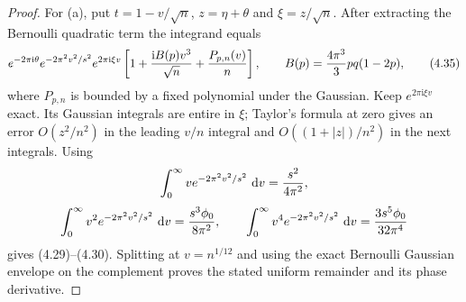 \documentclass[11pt,a4paper]{article}
\numberwithin{equation}{section}
\theoremstyle{definition}
\theoremstyle{remark}
\newcommand{\ii}{\mathrm i}
\newcommand{\dd}{\,\mathrm d}
\begin{document}
\begin{proof}
For (a), put $t=1-v/\sqrt n$, $z=\eta+\theta$ and
$\xi=z/\sqrt n$.  After extracting the Bernoulli quadratic term the
integrand equals
\[
 e^{-2\pi\ii\theta}e^{-2\pi^2v^2/s^2}e^{2\pi\ii\xi v}
 \left[1+{\ii B(p)v^3\over\sqrt n}+{P_{p,n}(v)\over n}\right],
 \qquad B(p)={4\pi^3\over3}pq(1-2p),                  \tag{4.35}
\]
where $P_{p,n}$ is bounded by a fixed polynomial under the Gaussian.
Keep $e^{2\pi\ii\xi v}$ exact.  Its Gaussian integrals are entire in
$\xi$; Taylor's formula at zero gives an error $O(z^2/n^2)$ in the
leading $v/n$ integral and $O((1+|z|)/n^2)$ in the next integrals.
Using
\[
 \int_0^\infty ve^{-2\pi^2v^2/s^2}\,\dd v={s^2\over4\pi^2},
\]
\[
 \int_0^\infty v^2e^{-2\pi^2v^2/s^2}\,\dd v
 ={s^3\phi_0\over8\pi^2},\qquad
 \int_0^\infty v^4e^{-2\pi^2v^2/s^2}\,\dd v
 ={3s^5\phi_0\over32\pi^4}
\]
gives (4.29)--(4.30).  Splitting at $v=n^{1/12}$ and using the exact
Bernoulli Gaussian envelope on the complement proves the stated uniform
remainder and its phase derivative.


\end{proof}
\end{document}
